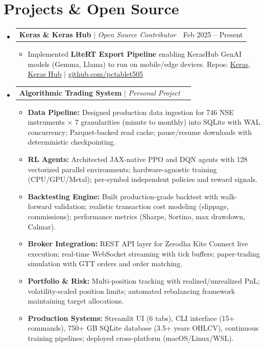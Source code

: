\documentclass[10pt, letterpaper]{article}
\makeatletter
\newcommand{\resumeItem}[1]{
  \item\small{
    {#1 \vspace{-2pt}}
  }
}
\newcommand{\resumeProjectHeading}[2]{
    \item
    \begin{tabular*}{0.98\textwidth}{l@{\extracolsep{\fill}}r}
      \small#1 & #2 \\
    \end{tabular*}\vspace{-7pt}
}
\newcommand{\resumeSubHeadingListStart}{\begin{itemize}[leftmargin=0.15in, label={}]}
\newcommand{\resumeSubHeadingListEnd}{\end{itemize}}
\newcommand{\resumeItemListStart}{\begin{itemize}}
\newcommand{\resumeItemListEnd}{\end{itemize}\vspace{-5pt}}
\makeatother
\begin{document}
\section{Projects \& Open Source}
  \resumeSubHeadingListStart
    \resumeProjectHeading
      {\textbf{Keras \& Keras Hub} $|$ \emph{Open Source Contributor}}{Feb 2025 -- Present}
      \resumeItemListStart
        \resumeItem{Implemented \textbf{LiteRT Export Pipeline} enabling KerasHub GenAI models (Gemma, Llama) to run on mobile/edge devices. Repos: \href{https://github.com/keras-team/keras}{Keras}, \href{https://github.com/keras-team/keras-hub}{Keras Hub} $|$ \href{https://github.com/pctablet505}{github.com/pctablet505}}
      \resumeItemListEnd
    \resumeProjectHeading
      {\textbf{Algorithmic Trading System} $|$ \emph{Personal Project}}{}
      \resumeItemListStart
        \resumeItem{\textbf{Data Pipeline:} Designed production data ingestion for 746 NSE instruments × 7 granularities (minute to monthly) into SQLite with WAL concurrency; Parquet-backed read cache; pause/resume downloads with deterministic checkpointing.}
        \resumeItem{\textbf{RL Agents:} Architected JAX-native PPO and DQN agents with 128 vectorized parallel environments; hardware-agnostic training (CPU/GPU/Metal); per-symbol independent policies and reward signals.}
        \resumeItem{\textbf{Backtesting Engine:} Built production-grade backtest with walk-forward validation; realistic transaction cost modeling (slippage, commissions); performance metrics (Sharpe, Sortino, max drawdown, Calmar).}
        \resumeItem{\textbf{Broker Integration:} REST API layer for Zerodha Kite Connect live execution; real-time WebSocket streaming with tick buffers; paper-trading simulation with GTT orders and order matching.}
        \resumeItem{\textbf{Portfolio \& Risk:} Multi-position tracking with realized/unrealized PnL; volatility-scaled position limits; automated rebalancing framework maintaining target allocations.}
        \resumeItem{\textbf{Production Systems:} Streamlit UI (6 tabs), CLI interface (15+ commands), 750+ GB SQLite database (3.5+ years OHLCV), continuous training pipelines; deployed cross-platform (macOS/Linux/WSL).}
      \resumeItemListEnd
  \resumeSubHeadingListEnd

\end{document}
